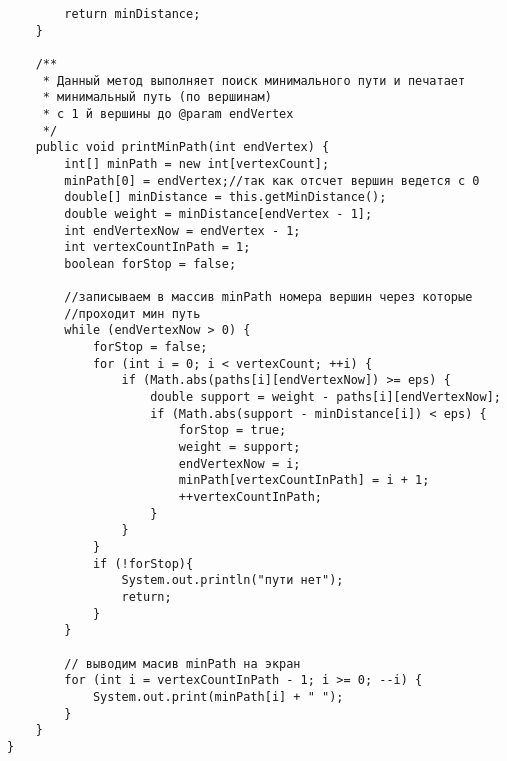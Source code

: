 \begin{verbatim}
        return minDistance;
    }

    /**
     * Данный метод выполняет поиск минимального пути и печатает
     * минимальный путь (по вершинам)
     * с 1 й вершины до @param endVertex
     */
    public void printMinPath(int endVertex) {
        int[] minPath = new int[vertexCount];
        minPath[0] = endVertex;//так как отсчет вершин ведется с 0
        double[] minDistance = this.getMinDistance();
        double weight = minDistance[endVertex - 1];
        int endVertexNow = endVertex - 1;
        int vertexCountInPath = 1;
        boolean forStop = false;

        //записываем в массив minPath номера вершин через которые
        //проходит мин путь
        while (endVertexNow > 0) {
            forStop = false;
            for (int i = 0; i < vertexCount; ++i) {
                if (Math.abs(paths[i][endVertexNow]) >= eps) {
                    double support = weight - paths[i][endVertexNow];
                    if (Math.abs(support - minDistance[i]) < eps) {
                        forStop = true;
                        weight = support;
                        endVertexNow = i;
                        minPath[vertexCountInPath] = i + 1;
                        ++vertexCountInPath;
                    }
                }
            }
            if (!forStop){
                System.out.println("пути нет");
                return;
            }
        }

        // выводим масив minPath на экран
        for (int i = vertexCountInPath - 1; i >= 0; --i) {
            System.out.print(minPath[i] + " ");
        }
    }
}
\end{verbatim}